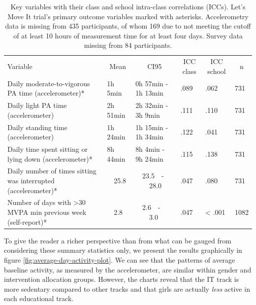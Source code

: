 \documentclass[british,man]{apa6}
\makeatletter
\newenvironment{lltable}{\begin{landscape}\begin{center}\begin{ThreePartTable}}{\end{ThreePartTable}\end{center}\end{landscape}}
\newcommand\LastLTentrywidth{1em}
\newlength\longtablewidth
\newcommand{\getlongtablewidth}{\begingroup \ifcsname LT@\roman{LT@tables}\endcsname \global\longtablewidth=0pt \renewcommand{\LT@entry}[2]{\global\advance\longtablewidth by ##2\relax\gdef\LastLTentrywidth{##2}}\@nameuse{LT@\roman{LT@tables}} \fi \endgroup}
\makeatother
\begin{document}
\begin{lltable}


\begin{longtable}{llllll}\noalign{\getlongtablewidth\global\LTcapwidth=\longtablewidth}
\caption{\label{tab:primary-outcome-vars-table-total}Key variables with their class and school intra-class correlations (ICCs). Let's Move It trial's primary outcome variables marked with asterisks. Accelerometry data is missing from 435 participants, of whom 169 due to not meeting the cutoff of at least 10 hours of measurement time for at least four days. Survey data missing from 84 participants.}\\
\toprule
Variable & \multicolumn{1}{c}{Mean} & \multicolumn{1}{c}{CI95} & \multicolumn{1}{c}{ICC class} & \multicolumn{1}{c}{ICC school} & \multicolumn{1}{c}{n}\\
\midrule
Daily moderate-to-vigorous PA time (accelerometer)* & 1h 5min & 0h 57min - 1h 13min & .089 & .062 & 731\\
Daily light PA time (accelerometer) & 2h 51min & 2h 32min - 3h 9min & .111 & .110 & 731\\
Daily standing time (accelerometer) & 1h 24min & 1h 15min - 1h 34min & .122 & .041 & 731\\
Daily time spent sitting or lying down (accelerometer)* & 8h 44min & 8h 4min - 9h 24min & .115 & .138 & 731\\
Daily number of times sitting was interrupted (accelerometer)* & \ \ 25.8 & \ \ 23.5\ \ -\ \ \ \ 28.0 & .047 & .080 & 731\\
Number of days with >30 MVPA min previous week (self-report)* & \ \  2.8 & \ \  2.6\ \ -\ \ \ \  3.0 & .047 & < .001 & 1082\\
\bottomrule
\end{longtable}
\end{lltable}

To give the reader a richer perspective than from what can be gauged from considering these summary statistics only, we present the results graphically in figure \ref{fig:average-day-activity-plot}. We can see that the patterns of average baseline activity, as measured by the accelerometer, are similar within gender and intervention allocation groups. However, the charts reveal that the IT track is more sedentary compared to other tracks and that girls are actually \emph{less} active in each educational track.
\end{document}
